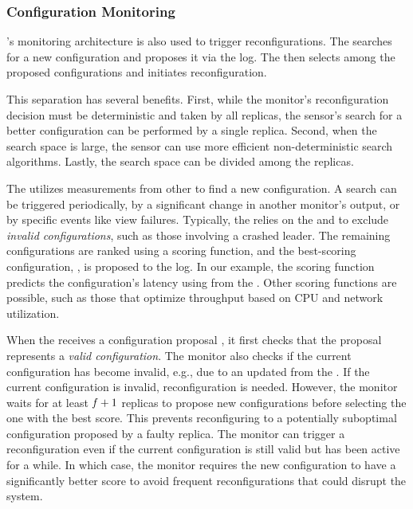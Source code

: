 \subsubsection{Configuration Monitoring}
\label{sec:config_sensor}

\Sysname's monitoring architecture is also used to trigger reconfigurations.
The \cfgsensor searches for a new configuration and proposes it via the log.
The \cfgmonitor then selects among the proposed configurations and initiates reconfiguration.

This separation has several benefits.
First, while the monitor's reconfiguration decision must be deterministic and taken by all replicas, the sensor's search for a better configuration can be performed by a single replica.
Second, when the search space is large, the sensor can use more efficient non-deterministic search algorithms.
Lastly, the search space can be divided among the replicas.

The \cfgsensor utilizes measurements from other \monitors to find a new configuration.
A search can be triggered periodically, by a significant change in another monitor's output, or by specific events like view failures.
Typically, the \cfgsensor relies on the \susmonitor and \mismonitor to exclude \textit{invalid configurations}, such as those involving a crashed leader.
The remaining configurations are ranked using a scoring function, and the best-scoring configuration, \Cfg, is proposed to the log.
In our example, the scoring function predicts the configuration's latency using \lm from the \latmonitor.
Other scoring functions are possible, such as those that optimize throughput based on CPU and network utilization.

When the \cfgmonitor receives a configuration proposal \Cfg, it first checks that the proposal represents a \textit{valid configuration}.
The monitor also checks if the current configuration has become invalid, e.g., due to an updated \Cand from the \susmonitor.
If the current configuration is invalid, reconfiguration is needed.
However, the monitor waits for at least $\mathit{f}+1$ replicas to propose new configurations before selecting the one with the best score.
This prevents reconfiguring to a potentially suboptimal configuration proposed by a faulty replica.
The monitor can trigger a reconfiguration even if the current configuration is still valid but has been active for a while.
In which case, the monitor requires the new configuration to have a significantly better score to avoid frequent reconfigurations that could disrupt the system.
